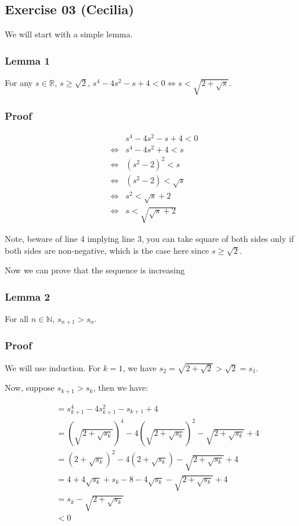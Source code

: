 \subsection*{Exercise 03 (Cecilia)}
We will start with a simple lemma.
\subsubsection*{Lemma 1}
For any $ s \in \mathbb{R} $, $ s \ge \sqrt{2} $, $ s^4 - 4s^2 - s + 4 < 0 \iff s < \sqrt{2 + \sqrt{s}} $.
\subsubsection*{Proof}
\begin{align*}
      & s^4 - 4s^2 - s + 4 < 0 \\
  \iff& s^4 - 4s^2 + 4     < s \\
  \iff& (s^2-2)^2          < s \\
  \iff& (s^2-2)            < \sqrt{s} \\
  \iff& s^2                < \sqrt{s} + 2 \\
  \iff& s                  < \sqrt{\sqrt{s} + 2}
\end{align*}

Note, beware of line 4 implying line 3, you can take square of both sides only if both sides are non-negative, which is the case here since $ s \ge \sqrt{2} $.

Now we can prove that the sequence is increasing

\subsubsection*{Lemma 2}
For all $ n \in \mathbb{N} $, $ s_{n+1} > s_n $.

\subsubsection*{Proof}
We will use induction. For $ k = 1 $, we have $ s_2 = \sqrt{2 + \sqrt{2}} > \sqrt{2} = s_1 $.

Now, suppose $ s_{k+1} > s_k $, then we have:

\begin{align*}
  &= s_{k+1}^4 - 4s_{k+1}^2 - s_{k+1} + 4 \\
  &= \left(\sqrt{2 + \sqrt{s_k}}\right)^4 - 4\left(\sqrt{2 + \sqrt{s_k}}\right)^2 - \sqrt{2 + \sqrt{s_k}} + 4 \\
  &= \left(2 + \sqrt{s_k}\right)^2 - 4\left(2 + \sqrt{s_k}\right) - \sqrt{2 + \sqrt{s_k}} + 4 \\
  &= 4 + 4\sqrt{s_k} + s_k - 8 - 4\sqrt{s_k} - \sqrt{2 + \sqrt{s_k}} + 4 \\
  &= s_k - \sqrt{2 + \sqrt{s_k}} \\
  &< 0
\end{align*}

